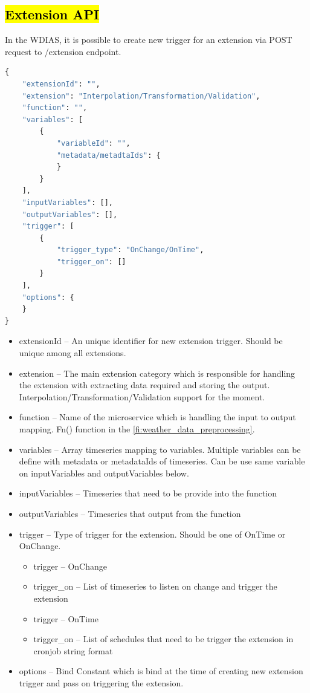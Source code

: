 \subsection{\hl{Extension API}}
In the WDIAS, it is possible to create new trigger for an extension via POST request to /extension endpoint.
\begin{lstlisting}[language=Python]
{
    "extensionId": "",
    "extension": "Interpolation/Transformation/Validation",
    "function": "",
    "variables": [
        {
            "variableId": "",
            "metadata/metadtaIds": {
            }
        }
    ],
    "inputVariables": [],
    "outputVariables": [],
    "trigger": [
        {
            "trigger_type": "OnChange/OnTime",
            "trigger_on": []
        }
    ],
    "options": {
    }
}
\end{lstlisting}
\begin{itemize}
    \item extensionId -- An unique identifier for new extension trigger. Should be unique among all extensions.
    \item extension -- The main extension category which is responsible for handling the extension with extracting data required and storing the output. Interpolation/Transformation/Validation support for the moment.
    \item function -- Name of the microservice which is handling the input to output mapping. Fn() function in the \ref{fi:weather_data_preprocessing}.
    \item variables -- Array timeseries mapping to variables. Multiple variables can be define with metadata or metadataIds of timeseries. Can be use same variable on inputVariables and outputVariables below.
    \item inputVariables -- Timeseries that need to be provide into the function
    \item outputVariables -- Timeseries that output from the function
    \item trigger -- Type of trigger for the extension. Should be one of OnTime or OnChange.
    \begin{itemize}
        \item trigger -- OnChange
        \item trigger\_on -- List of timeseries to listen on change and trigger the extension
    \end{itemize}
    \begin{itemize}
        \item trigger -- OnTime
        \item trigger\_on -- List of schedules that need to be trigger the extension in cronjob string format
    \end{itemize}
    \item options -- Bind Constant which is bind at the time of creating new extension trigger and pass on triggering the extension.
\end{itemize}

